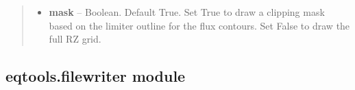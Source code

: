 \documentclass[letterpaper,10pt,english]{sphinxmanual}
\begin{document}
\begin{fulllineitems}
\begin{fulllineitems}
\begin{quote}
\begin{description}
\begin{itemize}
\item {} 
\textbf{mask} --
Boolean.
Default True.  Set True to draw a clipping mask based on the limiter outline for the flux contours.
Set False to draw the full RZ grid.

\end{itemize}

\end{description}\end{quote}

\end{fulllineitems}


\end{fulllineitems}



\subsection{eqtools.filewriter module}
\label{eqtools:module-eqtools.filewriter}\label{eqtools:eqtools-filewriter-module}
\end{document}
